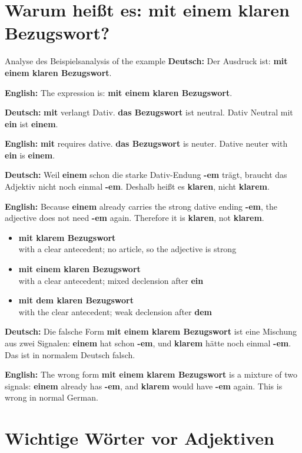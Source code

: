 \documentclass[a4paper,11pt]{article}
\newcommand{\GermanText}[1]{\textbf{Deutsch: }#1\par}
\newcommand{\EnglishText}[1]{{\small\color{SoftGray}\textbf{English: }#1\par}}
\newcommand{\ExampleItem}[2]{\item \textbf{#1}\\{\small\color{SoftGray}#2}}
\begin{document}
\section{Warum heißt es: mit einem klaren Bezugswort?}

\begin{grammarentry}{Analyse des Beispiels}{analysis of the example}
\GermanText{Der Ausdruck ist: \textbf{mit einem klaren Bezugswort}.}
\EnglishText{The expression is: \textbf{mit einem klaren Bezugswort}.}

\GermanText{\textbf{mit} verlangt Dativ. \textbf{das Bezugswort} ist neutral. Dativ Neutral mit \textbf{ein} ist \textbf{einem}.}
\EnglishText{\textbf{mit} requires dative. \textbf{das Bezugswort} is neuter. Dative neuter with \textbf{ein} is \textbf{einem}.}

\GermanText{Weil \textbf{einem} schon die starke Dativ-Endung \textbf{-em} trägt, braucht das Adjektiv nicht noch einmal \textbf{-em}. Deshalb heißt es \textbf{klaren}, nicht \textbf{klarem}.}
\EnglishText{Because \textbf{einem} already carries the strong dative ending \textbf{-em}, the adjective does not need \textbf{-em} again. Therefore it is \textbf{klaren}, not \textbf{klarem}.}

\begin{exbox}
\begin{itemize}
    \ExampleItem{mit klarem Bezugswort}{with a clear antecedent; no article, so the adjective is strong}
    \ExampleItem{mit einem klaren Bezugswort}{with a clear antecedent; mixed declension after \textbf{ein}}
    \ExampleItem{mit dem klaren Bezugswort}{with the clear antecedent; weak declension after \textbf{dem}}
\end{itemize}
\end{exbox}

\GermanText{Die falsche Form \textbf{mit einem klarem Bezugswort} ist eine Mischung aus zwei Signalen: \textbf{einem} hat schon \textbf{-em}, und \textbf{klarem} hätte noch einmal \textbf{-em}. Das ist in normalem Deutsch falsch.}
\EnglishText{The wrong form \textbf{mit einem klarem Bezugswort} is a mixture of two signals: \textbf{einem} already has \textbf{-em}, and \textbf{klarem} would have \textbf{-em} again. This is wrong in normal German.}
\end{grammarentry}

\section{Wichtige Wörter vor Adjektiven}
\end{document}
